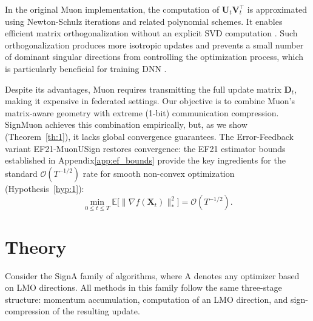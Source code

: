 \documentclass[letterpaper]{article} %
\begin{document}
In the original Muon implementation, the computation of $\mathbf{U}_t\mathbf{V}_t^\top$ is approximated using Newton-Schulz iterations and related polynomial schemes. It enables efficient matrix orthogonalization without an explicit SVD computation \cite{amsel2025polar, li2025note, liu2025muon}. Such orthogonalization produces more isotropic updates and prevents a small number of dominant singular directions from controlling the optimization process, which is particularly beneficial for training DNN \cite{bernstein2024old, shah2025practical}.

Despite its advantages, Muon requires transmitting the full update matrix $\mathbf{D}_t$, making it expensive in federated settings. Our objective is to combine Muon's matrix-aware geometry with extreme (1-bit) communication compression. SignMuon achieves this combination empirically, but, as we show (Theorem~\ref{th:1}), it lacks global convergence guarantees. The Error-Feedback variant EF21-MuonUSign restores convergence: the EF21 estimator bounds established in Appendix\ref{app:ef_bounds} provide the key ingredients for the standard $\mathcal{O}(T^{-1/2})$ rate for smooth non-convex optimization (Hypothesis~\ref{hyp:1}):
\begin{equation}
\min_{0 \le t \le T}\mathbb{E}\bigl[\|\nabla f(\mathbf{X}_t)\|_*^2\bigr]
= \mathcal{O}(T^{-1/2}).
\end{equation}


\section{Theory}\label{sec:theory}
Consider the SignA family of algorithms, where A denotes any optimizer based on LMO directions. All methods in this family follow the same three-stage structure: momentum accumulation, computation of an LMO direction, and sign-compression of the resulting update.
\end{document}
